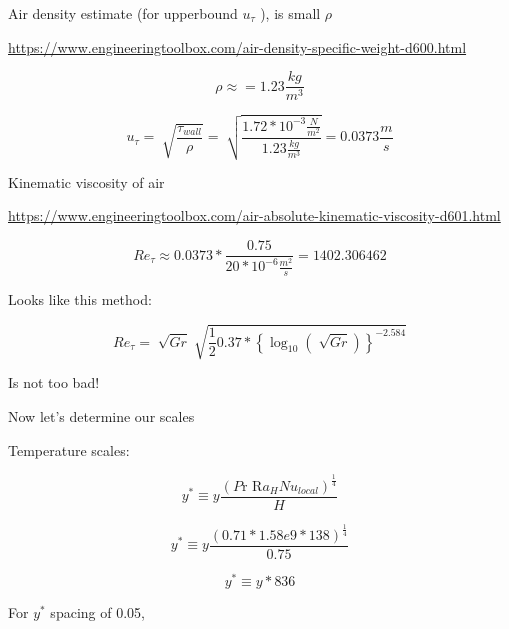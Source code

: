 \documentclass[12pt]{article}
\renewcommand{\_}{\kern-1.5pt\textunderscore\kern-1.5pt}
\begin{document}
Air density estimate (for upperbound  \( u_{ \tau} \) ), is small  \(  \rho  \) \par

\href{https://www.engineeringtoolbox.com/air-density-specific-weight-d_600.html}{https://www.engineeringtoolbox.com/air-density-specific-weight-d\_600.html}\par

 \[  \rho  \approx =1.23\frac{kg}{m^{3}} \] \par

 \[ u_{ \tau}=\sqrt[]{\frac{ \tau_{wall}}{ \rho }}=\sqrt[]{\frac{1.72\ast10^{-3}\frac{N}{m^{2}}}{1.23\frac{kg}{m^{3}}}}=0.0373\frac{m}{s} \] \par

Kinematic viscosity of air\par

\href{https://www.engineeringtoolbox.com/air-absolute-kinematic-viscosity-d_601.html}{https://www.engineeringtoolbox.com/air-absolute-kinematic-viscosity-d\_601.html}\par

 \[ Re_{ \tau} \approx  0.0373\ast\frac{0.75}{20\ast10^{-6}\frac{m^{2}}{s}}=1402.306462 \] \par

Looks like this method:\par

 \[ Re_{ \tau}=\sqrt[]{Gr}\sqrt[]{\frac{1}{2}0.37\ast \left\{ \log _{10} \left( \sqrt[]{Gr} \right)  \right\rbrace ^{-2.584}} \] \par

Is not too bad!\par

Now let’s determine our scales\par


\vspace{\baselineskip}
Temperature scales:\par

 \[ y^{\ast} \equiv y\frac{ \left( P\text{r R}a_{H}Nu_{local} \right) ^{\frac{1}{4}}}{H} \] \par

 \[ y^{\ast} \equiv y\frac{ \left( 0.71\ast1.58e9\ast138 \right) ^{\frac{1}{4}}}{0.75} \] \par

 \[ y^{\ast} \equiv y\ast836 \] \par

For  \( y^{\ast} \)  spacing of 0.05,\par
\end{document}
